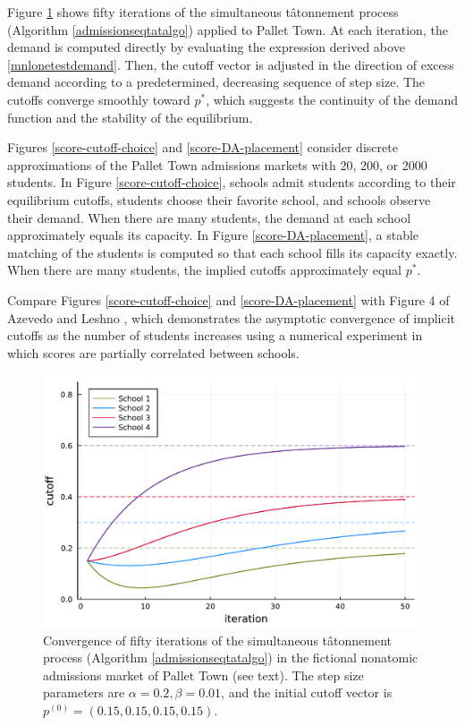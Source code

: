 \documentclass[12pt]{article}
\theoremstyle{definition}
\begin{document}
Figure \ref{tat-iter-cutoff} shows fifty iterations of the simultaneous t\^{a}tonnement process (Algorithm \ref{admissionseqtatalgo}) applied to Pallet Town. At each iteration, the demand is computed directly by evaluating the expression derived above \eqref{mnlonetestdemand}. Then, the cutoff vector is adjusted in the direction of excess demand according to a predetermined, decreasing sequence of step size. The cutoffs converge smoothly toward $p^*$, which suggests the continuity of the demand function and the stability of the equilibrium. 

Figures \ref{score-cutoff-choice} and \ref{score-DA-placement} consider discrete approximations of the Pallet Town admissions markets with 20, 200, or 2000 students. In Figure \ref{score-cutoff-choice}, schools admit students according to their equilibrium cutoffs, students choose their favorite school, and schools observe their demand. When there are many students, the demand at each school approximately equals its capacity. In Figure \ref{score-DA-placement}, a stable matching of the students is computed so that each school fills its capacity exactly. When there are many students, the implied cutoffs approximately equal $p^*$. 

Compare Figures \ref{score-cutoff-choice} and \ref{score-DA-placement} with Figure 4 of Azevedo and Leshno \parencite*{supplydemandfw}, which demonstrates the asymptotic convergence of implicit cutoffs as the number of students increases using a numerical experiment in which scores are partially correlated between schools. 

\begin{figure}
\begin{center}\includegraphics[width=\linewidth, ]{plots/tat-iter-cutoff.pdf}\end{center}
\captionsetup{singlelinecheck=off}
    \caption[.]{Convergence of fifty iterations of the simultaneous t\^{a}tonnement process (Algorithm \ref{admissionseqtatalgo}) in the fictional nonatomic admissions market of Pallet Town (see text). The step size parameters are $\alpha = 0.2, \beta = 0.01$, and the initial cutoff vector is $p^{(0)} = (0.15, 0.15, 0.15, 0.15)$. }
\label{tat-iter-cutoff}
\end{figure}
\end{document}
